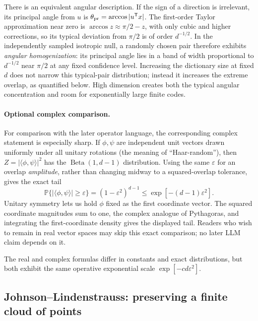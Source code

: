 \documentclass[
  aps,
  reprint,
  superscriptaddress,
  floatfix,
  nofootinbib,
  longbibliography
]{revtex4-2}
\newcommand{\Prob}{\mathbb{P}}
\newcommand{\T}{^{\mathsf{T}}}
\begin{document}
There is an equivalent angular description.  If the sign of a direction is
irrelevant, its principal angle from $u$ is
$\theta_{\rm pr}=\arccos|u\T x|$.  The first-order Taylor approximation near
zero is $\arccos z\approx\pi/2-z$, with only cubic and higher corrections, so its typical deviation from $\pi/2$ is of
order $d^{-1/2}$.  In the independently sampled isotropic null, a randomly
chosen pair therefore
exhibits \emph{angular homogenization}: its principal angle lies in a band of
width proportional to $d^{-1/2}$ near $\pi/2$ at any fixed confidence level.
Increasing the dictionary size at
fixed $d$ does not narrow this typical-pair distribution; instead it increases
the extreme overlap, as quantified below.  High dimension creates both the
typical angular concentration and room for exponentially large finite codes.

\paragraph{Optional complex comparison.}
For comparison with the later operator language, the corresponding complex
statement is especially sharp.  If $\phi,\psi$ are independent unit vectors
drawn uniformly under all unitary rotations (the meaning of ``Haar-random''), then
$Z=|\langle\phi,\psi\rangle|^2$ has the
$\operatorname{Beta}(1,d-1)$ distribution.  Using the same
$\varepsilon$ for an overlap \emph{amplitude}, rather than changing midway to
a squared-overlap tolerance, gives the exact tail
\begin{equation}
\label{eq:complex-haar-tail}
\Prob\{|\langle\phi,\psi\rangle|\geq\varepsilon\}
=(1-\varepsilon^2)^{d-1}
\leq
\exp[-(d-1)\varepsilon^2].
\end{equation}
Unitary symmetry lets us hold $\phi$ fixed as the first coordinate vector.
The squared coordinate magnitudes sum to one, the complex analogue of
Pythagoras, and integrating the first-coordinate density gives the displayed
tail.  Readers who wish to remain in real vector spaces may skip this exact
comparison; no later LLM claim depends on it.

The real and complex formulas differ in constants and exact distributions,
but both exhibit the same operative exponential scale
$\exp[-c d\varepsilon^2]$.

\subsection{Johnson--Lindenstrauss: preserving a finite cloud of points}
\label{sec:jl}
\end{document}
